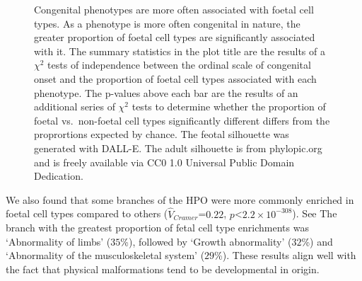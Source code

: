 \documentclass[
]{report}
\begin{document}
\begin{figure}[H]


\caption{\label{fig-congenitalD08295A6-16DC-499D-85A8-8BA656E013A2}Congenital
phenotypes are more often associated with foetal cell types. As a
phenotype is more often congenital in nature, the greater proportion of
foetal cell types are significantly associated with it. The summary
statistics in the plot title are the results of a \(\chi^2\) tests of
independence between the ordinal scale of congenital onset and the
proportion of foetal cell types associated with each phenotype. The
p-values above each bar are the results of an additional series of
\(\chi^2\) tests to determine whether the proportion of foetal
vs.~non-foetal cell types significantly different differs from the
proprortions expected by chance. The feotal silhouette was generated
with DALL-E. The adult silhouette is from phylopic.org and is freely
available via CC0 1.0 Universal Public Domain Dedication.}

\end{figure}%

We also found that some branches of the HPO were more commonly enriched
in foetal cell types compared to others (\(\hat{V}_{Cramer}\)=\(0.22\),
\(p\)\textless{}\(2.2 \times 10^{-308}\)). See The branch with the
greatest proportion of fetal cell type enrichments was `Abnormality of
limbs' (\(35\)\%), followed by `Growth abnormality' (\(32\)\%) and
`Abnormality of the musculoskeletal system' (\(29\)\%). These results
align well with the fact that physical malformations tend to be
developmental in origin.
\end{document}

